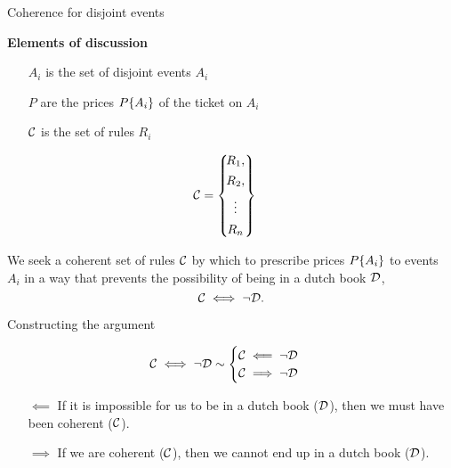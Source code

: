 \begin{frame}{Coherence for disjoint events}
\begin{minipage}[]{\linewidth}
\begin{minipage}[]{0.55\linewidth}
{\textbf{Elements of discussion}}
\begin{itemize}\itemsep0.8em
\item[$A_i$]
is the set of disjoint events $A_i$
\item[$P$] are the prices $P\{A_i\}$ of the ticket on $A_i$
\item[$\mathcal{C}$] is the set of rules $R_i$
\end{itemize}
\end{minipage}
\hfill
\begin{minipage}[]{0.3\linewidth}
\centering
$$
\mathcal{C}
=
\left\{\!\begin{matrix}
R_1, \\[1ex]
R_2, \\[1ex]
\vdots \\[1ex]
R_n
\end{matrix}\right\}
\quad
$$
\end{minipage}
\end{minipage}
\vfill
\begin{minipage}[]{\linewidth}
We seek a coherent set of rules $\mathcal{C}$ by which to prescribe prices $P\{A_i\}$ to events $A_i$ in a way that prevents the possibility of being in a dutch book $\mathcal{D}$,
$$\mathcal{C}\iff\neg\mathcal{D}.$$
\end{minipage}
\end{frame}

\begin{frame}{Constructing the argument}
\begin{minipage}[]{0.3\linewidth}
$$
\mathcal{C}\iff\neg \mathcal{D}
\sim
\begin{cases}
\mathcal{C}\impliedby\neg\mathcal{D} \\
\mathcal{C}\implies\neg\mathcal{D}
\end{cases}
$$
\end{minipage}
\hfill
\begin{minipage}[]{0.5\linewidth}
\begin{itemize}\itemsep1.2em
\item[$\impliedby$] If it is impossible for us to be in a dutch book ($\mathcal{D}$), then we must have been coherent ($\mathcal{C}$).


\item[$\implies$] If we are coherent ($\mathcal{C}$), then we cannot end up in a dutch book ($\mathcal{D}$).
\end{itemize}
\end{minipage}
\end{frame}


